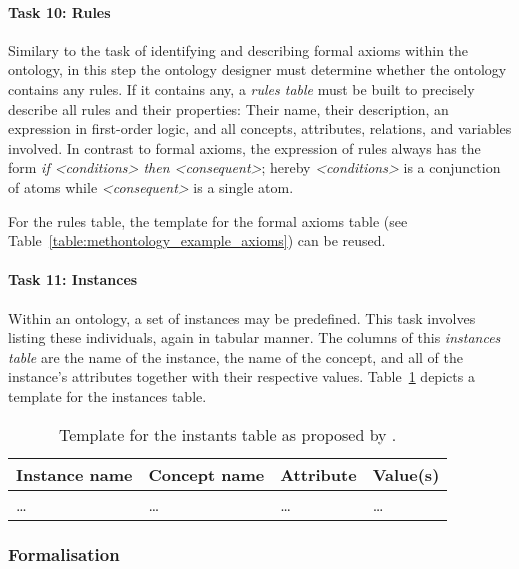\paragraph{Task 10: Rules}

Similary to the task of identifying and describing formal axioms within the ontology, in this step the ontology designer must determine whether the ontology contains any rules. If it contains any, a \emph{rules table} must be built to precisely describe all rules and their properties: Their name, their description, an expression in first-order logic, and all concepts, attributes, relations, and variables involved. In contrast to formal axioms, the expression of rules always has the form \emph{if <conditions> then <consequent>}; hereby \emph{<conditions>} is a conjunction of atoms while \emph{<consequent>} is a single atom.

For the rules table, the template for the formal axioms table (see Table~\ref{table:methontology_example_axioms}) can be reused.

\paragraph{Task 11: Instances}

Within an ontology, a set of instances may be predefined. This task involves listing these individuals, again in tabular manner. The columns of this \emph{instances table} are the name of the instance, the name of the concept, and all of the instance's attributes together with their respective values. Table~\ref{table:methontology_example_instances} depicts a template for the instances table.

\begin{table}
\centering
\begin{tabular}{|p{}|p{}|p{}|p{}|}
  \hline
  \textbf{Instance name} & \textbf{Concept name} & \textbf{Attribute} & \textbf{Value(s)} \\
  \hline\hline
  … & … & … & … \\
  \hline
\end{tabular}
\caption[Template for the instants table]{Template for the instants table as proposed by \methontology.}
\label{table:methontology_example_instances}
\end{table}

\subsubsection{Formalisation}

